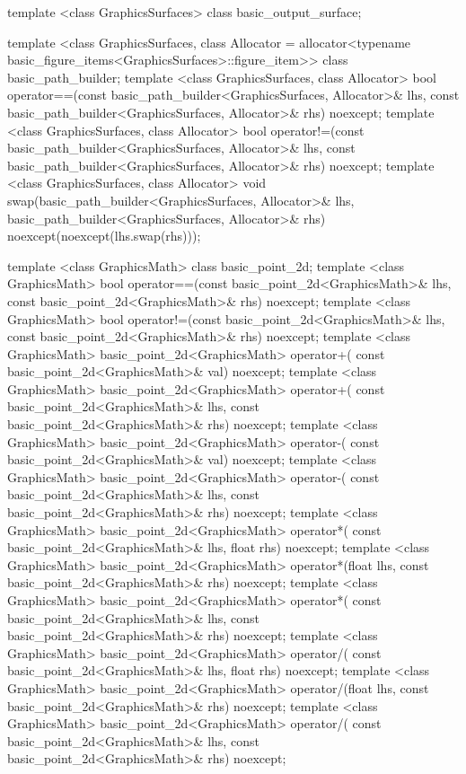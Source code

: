 \begin{codeblock}
{{{{    template <class GraphicsSurfaces>
    class basic_output_surface;
    
    template <class GraphicsSurfaces, class Allocator =
      allocator<typename basic_figure_items<GraphicsSurfaces>::figure_item>>
    class basic_path_builder;
    template <class GraphicsSurfaces, class Allocator>
    bool operator==(const basic_path_builder<GraphicsSurfaces, Allocator>& lhs,
      const basic_path_builder<GraphicsSurfaces, Allocator>& rhs) noexcept;
    template <class GraphicsSurfaces, class Allocator>
    bool operator!=(const basic_path_builder<GraphicsSurfaces, Allocator>& lhs,
      const basic_path_builder<GraphicsSurfaces, Allocator>& rhs) noexcept;
    template <class GraphicsSurfaces, class Allocator>
    void swap(basic_path_builder<GraphicsSurfaces, Allocator>& lhs,
      basic_path_builder<GraphicsSurfaces, Allocator>& rhs) noexcept(noexcept(lhs.swap(rhs)));
      
    template <class GraphicsMath>
    class basic_point_2d;
    template <class GraphicsMath>
    bool operator==(const basic_point_2d<GraphicsMath>& lhs,
      const basic_point_2d<GraphicsMath>& rhs) noexcept;
    template <class GraphicsMath>
    bool operator!=(const basic_point_2d<GraphicsMath>& lhs,
      const basic_point_2d<GraphicsMath>& rhs) noexcept;
    template <class GraphicsMath>
    basic_point_2d<GraphicsMath> operator+(
      const basic_point_2d<GraphicsMath>& val) noexcept;
    template <class GraphicsMath>
    basic_point_2d<GraphicsMath> operator+(
      const basic_point_2d<GraphicsMath>& lhs,
      const basic_point_2d<GraphicsMath>& rhs) noexcept;
    template <class GraphicsMath>
    basic_point_2d<GraphicsMath> operator-(
      const basic_point_2d<GraphicsMath>& val) noexcept;
    template <class GraphicsMath>
    basic_point_2d<GraphicsMath> operator-(
      const basic_point_2d<GraphicsMath>& lhs,
      const basic_point_2d<GraphicsMath>& rhs) noexcept;
    template <class GraphicsMath>
    basic_point_2d<GraphicsMath> operator*(
      const basic_point_2d<GraphicsMath>& lhs,
      float rhs) noexcept;
    template <class GraphicsMath>
    basic_point_2d<GraphicsMath> operator*(float lhs,
      const basic_point_2d<GraphicsMath>& rhs) noexcept;
    template <class GraphicsMath>
    basic_point_2d<GraphicsMath> operator*(
      const basic_point_2d<GraphicsMath>& lhs,
      const basic_point_2d<GraphicsMath>& rhs) noexcept;
    template <class GraphicsMath>
    basic_point_2d<GraphicsMath> operator/(
      const basic_point_2d<GraphicsMath>& lhs,
      float rhs) noexcept;
    template <class GraphicsMath>
    basic_point_2d<GraphicsMath> operator/(float lhs,
      const basic_point_2d<GraphicsMath>& rhs) noexcept;
    template <class GraphicsMath>
    basic_point_2d<GraphicsMath> operator/(
      const basic_point_2d<GraphicsMath>& lhs,
      const basic_point_2d<GraphicsMath>& rhs) noexcept;
  
}}}}
\end{codeblock}
